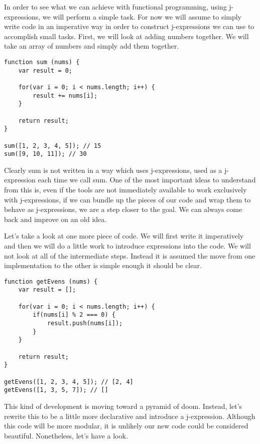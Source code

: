 \documentclass[a4paper,12pt,twoside]{book}
\begin{document}
 In order to see what we can achieve with functional programming, using j-expressions, we will perform a simple task. For now we will assume to simply write code in an imperative way in order to construct j-expressions we can use to accomplish small tasks. First, we will look at adding numbers together. We will take an array of numbers and simply add them together.
 
\begin{lstlisting}
function sum (nums) {
    var result = 0;
    
    for(var i = 0; i < nums.length; i++) {
        result += nums[i];
    }
    
    return result;
}

sum([1, 2, 3, 4, 5]); // 15
sum([9, 10, 11]); // 30
\end{lstlisting}
 
 Clearly sum is not written in a way which uses j-expressions, used as a j-expression each time we call sum. One of the most important ideas to understand from this is, even if the tools are not immediately available to work exclusively with j-expressions, if we can bundle up the pieces of our code and wrap them to behave as j-expressions, we are a step closer to the goal. We can always come back and improve on an old idea.
 
 Let's take a look at one more piece of code. We will first write it imperatively and then we will do a little work to introduce expressions into the code. We will not look at all of the intermediate steps. Instead it is assumed the move from one implementation to the other is simple enough it should be clear.
 
\begin{lstlisting}
function getEvens (nums) {
    var result = [];
    
    for(var i = 0; i < nums.length; i++) {
        if(nums[i] % 2 === 0) {
            result.push(nums[i]);        
        }    
    }
    
    return result;
}

getEvens([1, 2, 3, 4, 5]); // [2, 4]
getEvens([1, 3, 5, 7]); // []
\end{lstlisting}

 This kind of development is moving toward a pyramid of doom. Instead, let's rewrite this to be a little more declarative and introduce a j-expression. Although this code will be more modular, it is unlikely our new code could be considered beautiful. Nonetheless, let's have a look.
 
\end{document}
